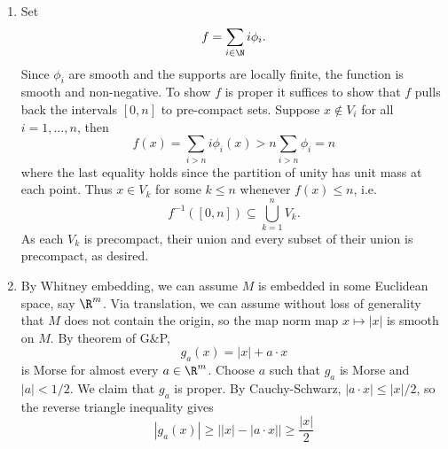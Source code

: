 \documentclass[reqno]{amsart}
\theoremstyle{definition}
\theoremstyle{remark}
\begin{document}
\begin{enumerate}	
	
	\item Set 
			\[ f = \sum_{i \in \N} i \phi_i. \]
		Since $\phi_i$ are smooth and the supports are locally finite, the function is smooth and non-negative. To show $f$ is proper it suffices to show that $f$ pulls back the intervals $[0, n]$ to pre-compact sets. Suppose $x \not\in V_i$ for all $i = 1, \dots, n$, then 
			\[ f(x) = \sum_{i > n} i \phi_i (x) > n \sum_{i > n} \phi_i = n \]
		where the last equality holds since the partition of unity has unit mass at each point. Thus $x \in V_k$ for some $k \leq n$ whenever $f(x) \leq n$, i.e. 
			\[ f^{-1}([0, n]) \subseteq \bigcup_{k =1}^n V_k. \]
		As each $V_k$ is precompact, their union and every subset of their union is precompact, as desired. 	
			
	\item By Whitney embedding, we can assume $M$ is embedded in some Euclidean space, say $\R^m$. Via translation, we can assume without loss of generality that $M$ does not contain the origin, so the map norm map $x \mapsto |x|$ is smooth on $M$. By theorem of G\&P, 
			\[ g_a (x) = |x| + a \cdot x \]
		is Morse for almost every $a \in \R^m$. Choose $a$ such that $g_a$ is Morse and $|a| < 1/2$. We claim that $g_a$ is proper. By Cauchy-Schwarz, $|a \cdot x| \leq |x|/2$, so the reverse triangle inequality gives
			\[ |g_a (x)| \geq \left| |x| - |a \cdot x| \right| \geq \frac{|x|}{2} \]
	

\end{enumerate}
\end{document}
